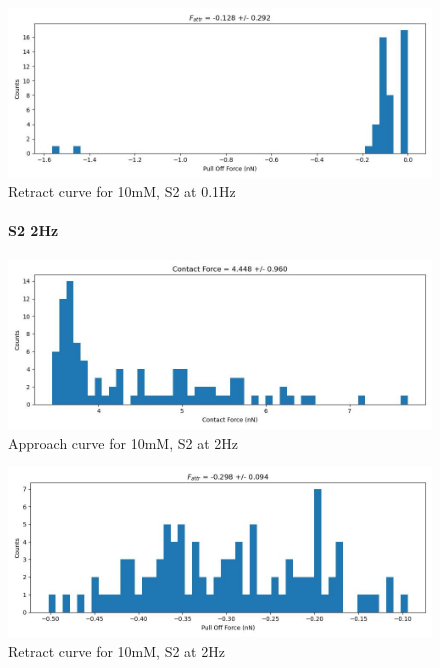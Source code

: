 \begin{figure}[h!]
\centering
\includegraphics[width=\textwidth]{chapter7/Tip speed/10mM/S2 0.1Hz/retract_f_a_hist.jpg}
\caption{Retract curve for 10mM, S2 at 0.1Hz}
\end{figure}

\newpage


\begin{figure}[h!]
\paragraph{S2 2Hz}
\centering
\includegraphics[width=\textwidth]{chapter7/Tip speed/10mM/S2 2Hz/approach_f_c_hist.jpg}
\caption{Approach curve for 10mM, S2 at 2Hz}
\end{figure}

\begin{figure}[h!]
\centering
\includegraphics[width=\textwidth]{chapter7/Tip speed/10mM/S2 2Hz/retract_f_a_hist.jpg}
\caption{Retract curve for 10mM, S2 at 2Hz}
\end{figure}

